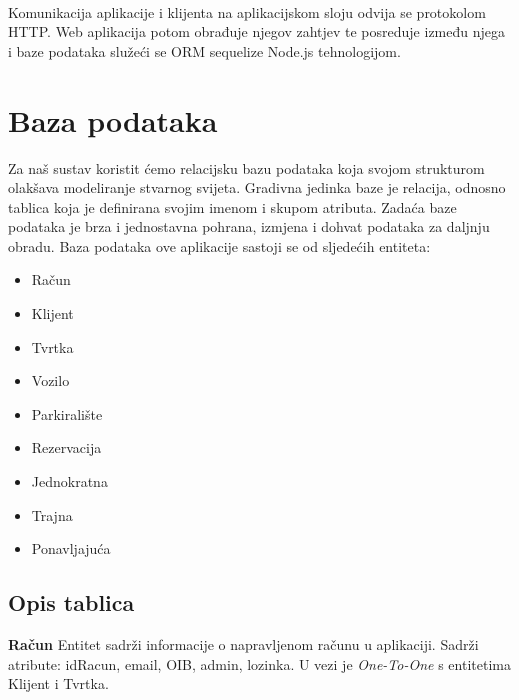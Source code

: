 		\paragraph{}
		
		Komunikacija aplikacije i klijenta na aplikacijskom sloju odvija se protokolom HTTP. Web aplikacija potom obrađuje njegov zahtjev te posreduje između njega i baze podataka služeći se ORM sequelize Node.js tehnologijom.

	
		

		

		\pagebreak		
		\section{Baza podataka}
			
		Za naš sustav koristit ćemo relacijsku bazu podataka koja svojom strukturom olakšava modeliranje stvarnog svijeta. Gradivna jedinka baze je relacija, odnosno tablica koja je definirana svojim imenom i skupom atributa. Zadaća baze podataka je brza i jednostavna pohrana, izmjena i dohvat podataka za daljnju obradu.
		\newline
        Baza podataka ove aplikacije sastoji se od sljedećih entiteta: 
        \begin{itemize}
            \item Račun
            \item Klijent
            \item Tvrtka
            \item Vozilo
            \item Parkiralište
            \item Rezervacija
            \item Jednokratna
            \item Trajna
            \item Ponavljajuća
        \end{itemize}
        
		
			\subsection{Opis tablica}
			
			    \textbf{Račun} \newline
			    Entitet sadrži informacije o napravljenom računu u aplikaciji. Sadrži
			    atribute: idRacun, email, OIB, admin, lozinka. U vezi je \textit{One-To-One} s entitetima Klijent i Tvrtka.
				
